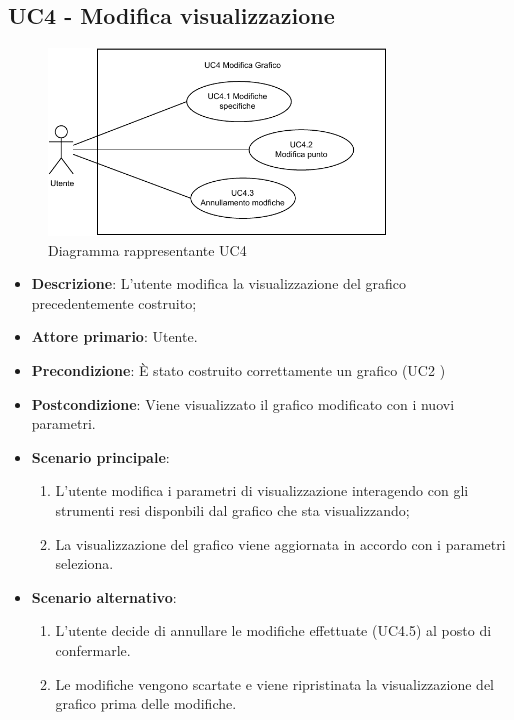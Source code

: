 \newpage
\subsection{UC4 - Modifica visualizzazione}
\label{sub:uc4}

\begin{figure}[h]
    \centering
    \includegraphics[width=0.8\textwidth]{componenti/casi-duso/diagrammi/UC4.pdf}
    \caption{Diagramma rappresentante UC4}
    \label{fig:UC4}
\end{figure}


\begin{itemize}
    \item \textbf{Descrizione}: L’utente modifica la visualizzazione del grafico precedentemente costruito;
	
    \item \textbf{Attore primario}: Utente.
    
    \item \textbf{Precondizione}:   È stato costruito correttamente un grafico (UC2 )

    \item \textbf{Postcondizione}:  Viene visualizzato il grafico modificato con i nuovi parametri.

	\item \textbf{Scenario principale}:
		\begin{enumerate}
			\item L'utente modifica i parametri di visualizzazione interagendo con gli strumenti resi disponbili dal grafico che sta visualizzando;
            \item La visualizzazione del grafico viene aggiornata in accordo con i parametri seleziona.
        \end{enumerate}

    \item \textbf{Scenario alternativo}:
        \begin{enumerate}
            \item L'utente decide di annullare le modifiche effettuate (UC4.5) al posto di confermarle.   
            \item Le modifiche vengono scartate e viene ripristinata la visualizzazione del grafico prima delle modifiche.
        \end{enumerate}
    
\end{itemize}

